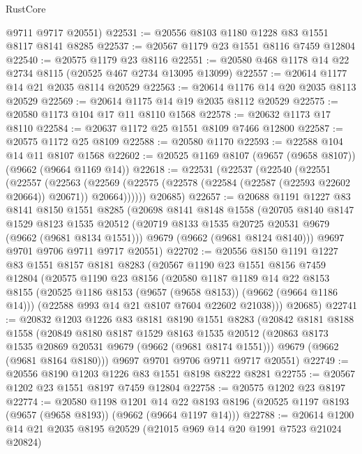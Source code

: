 \begin{lexlean}{RustCore}
\begin{coremodule}
      @9711
      @9717
      @20551)
@22531 := @20556 @8103 @1180 @1228 @83 @1551 @8117 @8141 @8285
@22537 := @20567 @1179 @23 @1551 @8116 @7459 @12804
@22540 := @20575 @1179 @23 @8116
@22551 := @20580 @468 @1178 @14 @22 @2734 @8115 (@20525 @467 @2734 @13095 @13099)
@22557 := @20614 @1177 @14 @21 @2035 @8114 @20529
@22563 := @20614 @1176 @14 @20 @2035 @8113 @20529
@22569 := @20614 @1175 @14 @19 @2035 @8112 @20529
@22575 := @20580 @1173 @104 @17 @11 @8110 @1568
@22578 := @20632 @1173 @17 @8110
@22584 := @20637 @1172 @25 @1551 @8109 @7466 @12800
@22587 := @20575 @1172 @25 @8109
@22588 := @20580 @1170
@22593 := @22588 @104 @14 @11 @8107 @1568
@22602 := @20525 @1169 @8107 (@9657 (@9658 @8107)) (@9662 (@9664 @1169 @14))
@22618 := @22531
    (@22537
      (@22540
        (@22551
          (@22557
            (@22563
              (@22569 (@22575 (@22578 (@22584 (@22587 (@22593 @22602 @20664)) @20671)) @20664))))))
      @20685)
@22657 := @20688
    @1191
    @1227
    @83
    @8141
    @8150
    @1551
    @8285
    (@20698
      @8141
      @8148
      @1558
      (@20705
        @8140
        @8147
        @1529
        @8123
        @1535
        @20512
        (@20719 @8133 @1535 @20725 @20531 @9679 (@9662 (@9681 @8134 @1551)))
        @9679
        (@9662 (@9681 @8124 @8140)))
      @9697
      @9701
      @9706
      @9711
      @9717
      @20551)
@22702 := @20556
    @8150
    @1191
    @1227
    @83
    @1551
    @8157
    @8181
    @8283
    (@20567
      @1190
      @23
      @1551
      @8156
      @7459
      @12804
      (@20575
        @1190
        @23
        @8156
        (@20580
          @1187
          @1189
          @14
          @22
          @8153
          @8155
          (@20525 @1186 @8153 (@9657 (@9658 @8153)) (@9662 (@9664 @1186 @14)))
          (@22588 @993 @14 @21 @8107 @7604 @22602 @21038)))
      @20685)
@22741 := @20832
    @1203
    @1226
    @83
    @8181
    @8190
    @1551
    @8283
    (@20842
      @8181
      @8188
      @1558
      (@20849
        @8180
        @8187
        @1529
        @8163
        @1535
        @20512
        (@20863 @8173 @1535 @20869 @20531 @9679 (@9662 (@9681 @8174 @1551)))
        @9679
        (@9662 (@9681 @8164 @8180)))
      @9697
      @9701
      @9706
      @9711
      @9717
      @20551)
@22749 := @20556 @8190 @1203 @1226 @83 @1551 @8198 @8222 @8281
@22755 := @20567 @1202 @23 @1551 @8197 @7459 @12804
@22758 := @20575 @1202 @23 @8197
@22774 := @20580
    @1198
    @1201
    @14
    @22
    @8193
    @8196
    (@20525 @1197 @8193 (@9657 (@9658 @8193)) (@9662 (@9664 @1197 @14)))
@22788 := @20614 @1200 @14 @21 @2035 @8195 @20529 (@21015 @969 @14 @20 @1991 @7523 @21024 @20824)

\end{coremodule}
\end{lexlean}

